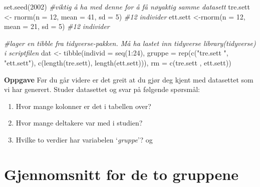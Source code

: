 \documentclass[
]{book}
\newenvironment{Shaded}{\begin{snugshade}}{\end{snugshade}}
\newcommand{\AttributeTok}[1]{\textcolor[rgb]{0.77,0.63,0.00}{#1}}
\newcommand{\CommentTok}[1]{\textcolor[rgb]{0.56,0.35,0.01}{\textit{#1}}}
\newcommand{\DecValTok}[1]{\textcolor[rgb]{0.00,0.00,0.81}{#1}}
\newcommand{\FunctionTok}[1]{\textcolor[rgb]{0.00,0.00,0.00}{#1}}
\newcommand{\NormalTok}[1]{#1}
\newcommand{\OtherTok}[1]{\textcolor[rgb]{0.56,0.35,0.01}{#1}}
\newcommand{\SpecialCharTok}[1]{\textcolor[rgb]{0.00,0.00,0.00}{#1}}
\newcommand{\StringTok}[1]{\textcolor[rgb]{0.31,0.60,0.02}{#1}}
\providecommand{\tightlist}{%
  \setlength{\itemsep}{0pt}\setlength{\parskip}{0pt}}
\begin{document}
\begin{Shaded}
\begin{Highlighting}[]
\FunctionTok{set.seed}\NormalTok{(}\DecValTok{2002}\NormalTok{) }\CommentTok{\#viktig å ha med denne for å få nøyaktig samme datasett}
\NormalTok{tre.sett }\OtherTok{\textless{}{-}} \FunctionTok{rnorm}\NormalTok{(}\AttributeTok{n =} \DecValTok{12}\NormalTok{, }\AttributeTok{mean =} \DecValTok{41}\NormalTok{, }\AttributeTok{sd =} \DecValTok{5}\NormalTok{) }\CommentTok{\#12 individer}
\NormalTok{ett.sett }\OtherTok{\textless{}{-}}\FunctionTok{rnorm}\NormalTok{(}\AttributeTok{n =} \DecValTok{12}\NormalTok{, }\AttributeTok{mean =} \DecValTok{21}\NormalTok{, }\AttributeTok{sd =} \DecValTok{5}\NormalTok{) }\CommentTok{\#12 individer}

\CommentTok{\#lager en tibble fra tidyverse{-}pakken. Må ha lastet inn tidyverse library(tidyverse) i scriptfilen}
\NormalTok{dat }\OtherTok{\textless{}{-}} \FunctionTok{tibble}\NormalTok{(}\AttributeTok{individ =} \FunctionTok{seq}\NormalTok{(}\DecValTok{1}\SpecialCharTok{:}\DecValTok{24}\NormalTok{),}
              \AttributeTok{gruppe =} \FunctionTok{rep}\NormalTok{(}\FunctionTok{c}\NormalTok{(}\StringTok{"tre.sett "}\NormalTok{, }\StringTok{"ett.sett"}\NormalTok{), }\FunctionTok{c}\NormalTok{(}\FunctionTok{length}\NormalTok{(tre.sett), }\FunctionTok{length}\NormalTok{(ett.sett))),}
              \AttributeTok{rm =} \FunctionTok{c}\NormalTok{(tre.sett , ett.sett))}
\end{Highlighting}
\end{Shaded}

\textbf{Oppgave}
Før du går videre er det greit at du gjør deg kjent med datasettet som vi har generert. Studer datasettet og svar på følgende spørsmål:

\begin{enumerate}
\def\labelenumi{\alph{enumi})}
\tightlist
\item
  Hvor mange kolonner er det i tabellen over?
\item
  Hvor mange deltakere var med i studien?
\item
  Hvilke to verdier har variabelen `\emph{gruppe}'? og
\end{enumerate}

\hypertarget{gjennomsnitt-for-de-to-gruppene}{%
\section{Gjennomsnitt for de to gruppene}\label{gjennomsnitt-for-de-to-gruppene}}
\end{document}

